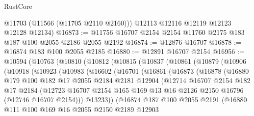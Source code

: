 \begin{lexlean}{RustCore}
\begin{coremodule}
        @11703
        (@11566 (@11705 @2110 @2160)))
      @12113
      @12116
      @12119
      @12123
      @12128
      @12134)
@16873 := @11756 @16707 @2154 @2154 @11760 @2175 @183 @187 @100 @2055 @2186 @2055 @2192
@16874 := @12876 @16707
@16878 := @16874 @183 @100 @2055 @2185
@16880 := @12891 @16707 @2154
@16956 := @10594
    (@10763
      (@10810
        (@10812
          (@10815
            (@10837
              (@10861
                (@10879
                  (@10906
                    (@10918
                      (@10923
                        (@10983
                          (@16602
                            (@16701
                              (@16861
                                (@16873
                                  (@16878
                                    (@16880
                                      @179
                                      @100
                                      @182
                                      @17
                                      @2055
                                      @2184
                                      @2181
                                      @12904
                                      (@12714
                                        @16707
                                        @2154
                                        @182
                                        @17
                                        @2184
                                        (@12723
                                          @16707
                                          @2154
                                          @165
                                          @169
                                          @13
                                          @16
                                          @2126
                                          @2150
                                          @16796
                                          (@12746 @16707 @2154)))
                                      @13233))
                                  (@16874
                                    @187
                                    @100
                                    @2055
                                    @2191
                                    (@16880
                                      @111
                                      @100
                                      @169
                                      @16
                                      @2055
                                      @2150
                                      @2189
                                      @12903

\end{coremodule}
\end{lexlean}
